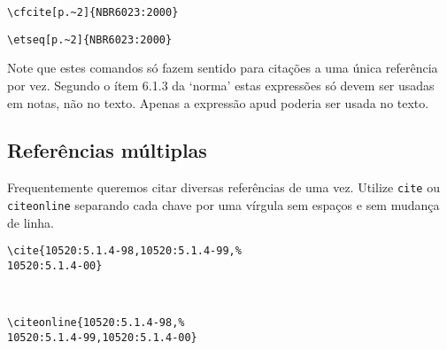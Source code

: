 \documentclass[espacosimples]{abnt}
\newcommand{\VerbL}{0.54\textwidth}
\newcommand{\LatL}{0.45\textwidth}
\begin{document}
\noindent\begin{minipage}[t]{\VerbL}\small\begin{verbatim}
\cfcite[p.~2]{NBR6023:2000}
\end{verbatim}\end{minipage}\begin{minipage}[t]{\LatL}\small
{}
\end{minipage}

\noindent\begin{minipage}[t]{\VerbL}\small\begin{verbatim}
\etseq[p.~2]{NBR6023:2000}
\end{verbatim}\end{minipage}\begin{minipage}[t]{\LatL}\small
{}
\end{minipage}


Note que estes comandos só fazem sentido para citações a uma única referência
por vez. Segundo o ítem 6.1.3 da `norma' \cite{NBR10520:2001} estas expressões só devem ser
usadas em notas, não no texto. Apenas a expressão apud poderia ser usada no texto.

\subsection{Referências múltiplas}
\label{mult-ref}

Frequentemente queremos citar diversas referências de uma vez.
Utilize {\tt cite}  ou {\tt citeonline} separando cada chave
por uma vírgula sem espaços e sem mudança de linha.

\vspace{5mm}
\noindent\begin{minipage}[t]{\VerbL}\small\begin{verbatim}
\cite{10520:5.1.4-98,10520:5.1.4-99,%
10520:5.1.4-00}
\end{verbatim}\end{minipage}\begin{minipage}[t]{\LatL}\small
\cite{10520:5.1.4-98,10520:5.1.4-99,10520:5.1.4-00}
\end{minipage}\vspace{5mm}\\

\noindent\begin{minipage}[t]{\VerbL}\small\begin{verbatim}
\citeonline{10520:5.1.4-98,%
10520:5.1.4-99,10520:5.1.4-00}
\end{verbatim}\end{minipage}\begin{minipage}[t]{\LatL}\small
{}
\end{minipage}\vspace{5mm}\\
\end{document}
